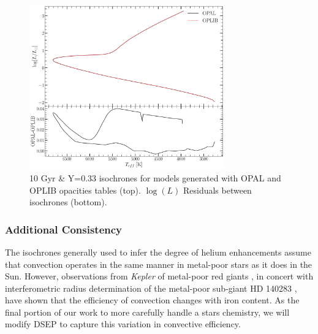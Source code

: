 \begin{figure}
	\centering
	\includegraphics[width=0.75\textwidth]{src/Figures/033ZIsosOPALOPLIB.pdf}
	\caption{10 Gyr \& Y=0.33 isochrones for models generated with OPAL and
	OPLIB opacities tables (top). $\log(L)$ Residuals between isochrones (bottom).}
	\label{fig:NGC2808ISO}
\end{figure}

\subsubsection{Additional Consistency}
The isochrones generally used to infer the degree of helium enhancements assume that
convection operates in the same manner in metal-poor stars as it does in the
Sun. However, observations from \textit{Kepler} of metal-poor red giants
\citep{Bonaca2012, tayar2017correlation}, in concert with interferometric
radius determination of the metal-poor sub-giant HD 140283
\citep{creevey2015benchmark}, have shown that the efficiency of convection
changes with iron content. As the final portion of our work to more carefully
handle a stars chemistry, we will modify DSEP to capture this variation in
convective efficiency. 
